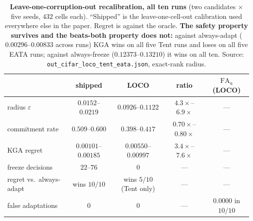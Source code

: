 \begin{table}[t]\centering\footnotesize
\caption{\textbf{Leave-one-corruption-out recalibration, all ten runs} (two candidates $\times$ five
seeds, $432$ cells each). ``Shipped'' is the leave-one-cell-out calibration used everywhere else in
the paper. Regret is against the oracle. \textbf{The safety property survives and the beats-both
property does not:} against always-adapt ($0.00296$--$0.00833$ across runs) \textsc{KGA} wins on all
five Tent runs and loses on all five EATA runs; against always-freeze ($0.12373$--$0.13210$) it wins
on all ten. Source: \texttt{out\_cifar\_loco\_tent\_eata.json}, exact-rank radius.}
\label{tab:loco-ten}
\begin{tabular}{@{}lcccc@{}}
\toprule
& shipped & LOCO & ratio & $\mathrm{FA}_{\mathrm u}$ (LOCO) \\
\midrule
radius $\varepsilon$ & $0.0152$--$0.0219$ & $0.0926$--$0.1122$ & $4.3\times$--$6.9\times$ & --- \\
commitment rate & $0.509$--$0.600$ & $0.398$--$0.417$ & $0.70\times$--$0.80\times$ & --- \\
\textsc{KGA} regret & $0.00101$--$0.00185$ & $0.00550$--$0.00997$ & $3.4\times$--$7.6\times$ & --- \\
freeze decisions & $22$--$76$ & $0$ & --- & --- \\
regret vs.\ always-adapt & wins $10/10$ & wins $5/10$ (Tent only) & --- & --- \\
false adaptations & $0$ & $0$ & --- & $\mathbf{0.0000}$ in $10/10$ \\
\bottomrule
\end{tabular}
\end{table}

